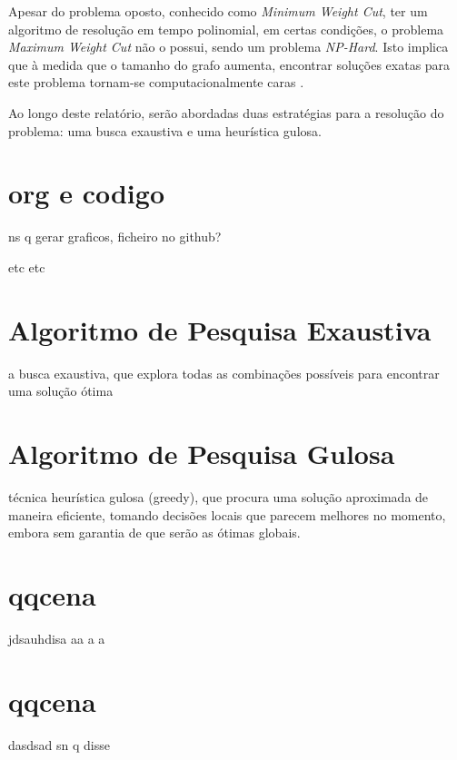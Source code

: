\documentclass[mirror]{revdetua}
\begin{document}
Apesar do problema oposto, conhecido como \textit{Minimum Weight Cut}, ter um algoritmo de resolução em tempo polinomial, em certas condições, o problema \textit{Maximum Weight Cut} não o possui, sendo um problema \textit{NP-Hard}. Isto implica que à medida que o tamanho do grafo aumenta, encontrar soluções exatas para este problema tornam-se computacionalmente caras \cite{WP24}.

Ao longo deste relatório, serão abordadas duas estratégias para a resolução do problema: uma busca exaustiva e uma heurística gulosa.


\section{org e codigo}

ns q gerar graficos, ficheiro no github?

etc etc

\section{Algoritmo de Pesquisa Exaustiva}


a busca exaustiva, que explora todas as combinações possíveis para encontrar uma solução ótima

\section{Algoritmo de Pesquisa Gulosa}

técnica heurística gulosa (greedy), que procura uma solução aproximada de maneira eficiente, tomando decisões locais que parecem melhores no momento, embora sem garantia de que serão as ótimas globais.

\section{qqcena}

jdsauhdisa
aa a a
\section{qqcena}
dasdsad sn q disse


\end{document}
